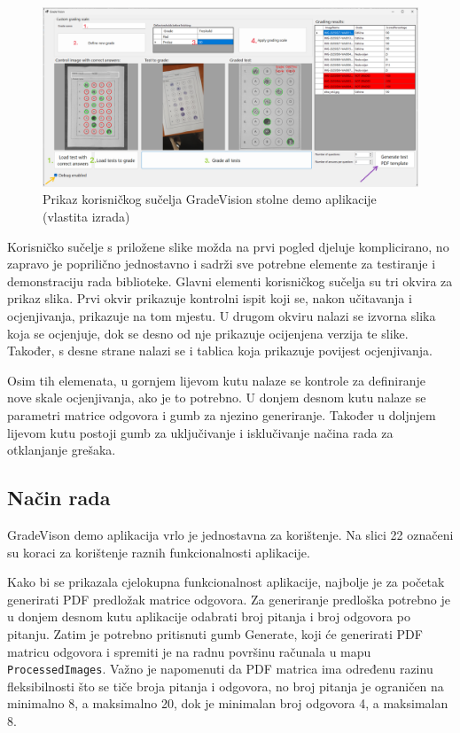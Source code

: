 \documentclass{foi}
\begin{document}
\begin{figure}[H]
\centering
\includegraphics[width=1.0\linewidth]{slike/GradeVision ui.png}
\caption{Prikaz korisničkog sučelja GradeVision stolne demo aplikacije (vlastita izrada)}
\end{figure}

Korisničko sučelje s priložene slike možda na prvi pogled djeluje komplicirano, no zapravo je poprilično jednostavno i sadrži sve potrebne elemente za testiranje i demonstraciju rada biblioteke. Glavni elementi korisničkog sučelja su tri okvira za prikaz slika. Prvi okvir prikazuje kontrolni ispit koji se, nakon učitavanja i ocjenjivanja, prikazuje na tom mjestu. U drugom okviru nalazi se izvorna slika koja se ocjenjuje, dok se desno od nje prikazuje ocijenjena verzija te slike. Također, s desne strane nalazi se i tablica koja prikazuje povijest ocjenjivanja.

Osim tih elemenata, u gornjem lijevom kutu nalaze se kontrole za definiranje nove skale ocjenjivanja, ako je to potrebno. U donjem desnom kutu nalaze se parametri matrice odgovora i gumb za njezino generiranje. Također u doljnjem lijevom kutu postoji gumb za uključivanje i isklučivanje načina rada za otklanjanje grešaka.

\subsection{Način rada}

GradeVison demo aplikacija vrlo je jednostavna za korištenje. Na slici 22 označeni su koraci za korištenje raznih funkcionalnosti aplikacije.

Kako bi se prikazala cjelokupna funkcionalnost aplikacije, najbolje je za početak generirati PDF predložak matrice odgovora. Za generiranje predloška potrebno je u donjem desnom kutu aplikacije odabrati broj pitanja i broj odgovora po pitanju. Zatim je potrebno pritisnuti gumb Generate, koji će generirati PDF matricu odgovora i spremiti je na radnu površinu računala u mapu \texttt{ProcessedImages}. Važno je napomenuti da PDF matrica ima određenu razinu fleksibilnosti što se tiče broja pitanja i odgovora, no broj pitanja je ograničen na minimalno 8, a maksimalno 20, dok je minimalan broj odgovora 4, a maksimalan 8.
\end{document}
